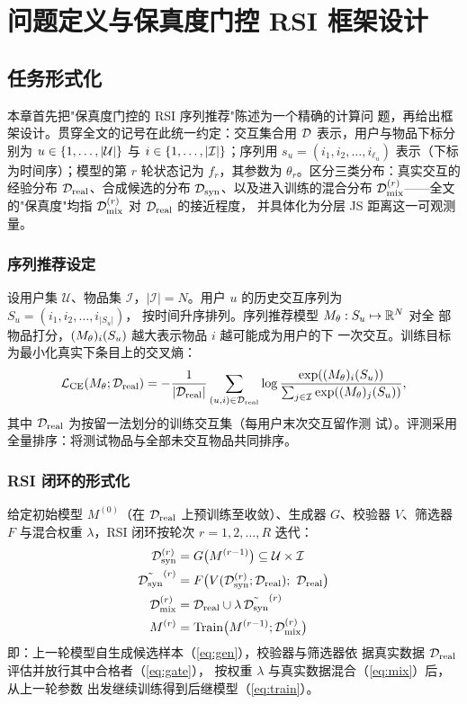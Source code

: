 \chapter{问题定义与保真度门控 RSI 框架设计}\label{ch:framework}

\section{任务形式化}
本章首先把"保真度门控的 RSI 序列推荐"陈述为一个精确的计算问
题，再给出框架设计。贯穿全文的记号在此统一约定：交互集合用
$\mathcal{D}$ 表示，用户与物品下标分别为 $u \in \{1,\dots,|\mathcal{U}|\}$ 与
$i \in \{1,\dots,|\mathcal{I}|\}$；序列用 $s_u = (i_1, i_2, \dots,
i_{\ell_u})$ 表示（下标为时间序）；模型的第 $r$ 轮状态记为
$f_r$，其参数为 $\theta_r$。区分三类分布：真实交互的经验分布
$\mathcal{D}_{\mathrm{real}}$、合成候选的分布 $\mathcal{D}_{\mathrm{syn}}$、以及进入训练的混合分布
$\mathcal{D}_{\mathrm{mix}}^{(r)}$——全文的"保真度"均指 $\mathcal{D}_{\mathrm{mix}}^{(r)}$ 对 $\mathcal{D}_{\mathrm{real}}$ 的接近程度，
并具体化为分层 JS 距离这一可观测量。

\subsection{序列推荐设定}
设用户集 $\mathcal{U}$、物品集 $\mathcal{I}$，$|\mathcal{I}| =
N$。用户 $u$ 的历史交互序列为 $S_u = (i_1, i_2, \dots, i_{|S_u|})$，
按时间升序排列。序列推荐模型 $M_{\theta}: S_u \mapsto \mathbb{R}^{N}$ 对全
部物品打分，$(M_{\theta})_i(S_u)$ 越大表示物品 $i$ 越可能成为用户的下
一次交互。训练目标为最小化真实下条目上的交叉熵：
\begin{equation}\label{eq:ce}
\mathcal{L}_{\mathrm{CE}}(M_{\theta}; \mathcal{D}_{\mathrm{real}}) =
-\frac{1}{|\mathcal{D}_{\mathrm{real}}|}\sum_{(u, i) \in \mathcal{D}_{\mathrm{real}}}
\log \frac{\exp((M_{\theta})_i(S_u))}{\sum_{j \in \mathcal{I}}
\exp((M_{\theta})_j(S_u))},
\end{equation}
其中 $\mathcal{D}_{\mathrm{real}}$ 为按留一法划分的训练交互集（每用户末次交互留作测
试）。评测采用全量排序：将测试物品与全部未交互物品共同排序。

\subsection{RSI 闭环的形式化}
\begin{definition}[递归自改进闭环]\label{def:rsi}
给定初始模型 $M^{(0)}$（在 $\mathcal{D}_{\mathrm{real}}$ 上预训练至收敛）、生成器
$G$、校验器 $V$、筛选器 $F$ 与混合权重 $\lambda$，RSI 闭环按轮次
$r = 1, 2, \dots, R$ 迭代：
\begin{align}
\mathcal{D}_{\mathrm{syn}}^{(r)} &= G\big(M^{(r-1)}\big) \subseteq
\mathcal{U} \times \mathcal{I}
\label{eq:gen}\\
\tilde{\mathcal{D}_{\mathrm{syn}}}^{(r)} &= F\big(V(\mathcal{D}_{\mathrm{syn}}^{(r)}; \mathcal{D}_{\mathrm{real}});\ \mathcal{D}_{\mathrm{real}}\big)
\label{eq:gate}\\
\mathcal{D}_{\mathrm{mix}}^{(r)} &= \mathcal{D}_{\mathrm{real}} \cup \lambda\,\tilde{\mathcal{D}_{\mathrm{syn}}}^{(r)}
\label{eq:mix}\\
M^{(r)} &= \mathrm{Train}\big(M^{(r-1)}; \mathcal{D}_{\mathrm{mix}}^{(r)}\big)
\label{eq:train}
\end{align}
即：上一轮模型自生成候选样本（\ref{eq:gen}），校验器与筛选器依
据真实数据 $\mathcal{D}_{\mathrm{real}}$ 评估并放行其中合格者（\ref{eq:gate}），
按权重 $\lambda$ 与真实数据混合（\ref{eq:mix}）后，从上一轮参数
出发继续训练得到后继模型（\ref{eq:train}）。
\end{definition}

